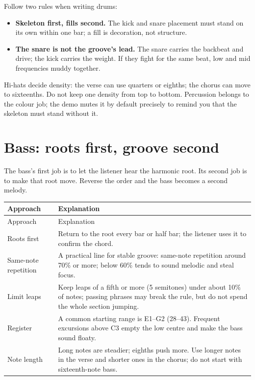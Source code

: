 Follow two rules when writing drums:

\begin{itemize}
\item \textbf{Skeleton first, fills second.} The kick and snare placement must stand on its own within one bar; a fill is decoration, not structure.
\item \textbf{The snare is not the groove's lead.} The snare carries the backbeat and drive; the kick carries the weight. If they fight for the same beat, low and mid frequencies muddy together.
\end{itemize}

Hi-hats decide density: the verse can use quarters or eighths; the chorus can move to sixteenths. Do not keep one density from top to bottom. Percussion belongs to the colour job; the demo mutes it by default precisely to remind you that the skeleton must stand without it.

\section{Bass: roots first, groove second}
\label{sec:bass}

The bass's first job is to let the listener hear the harmonic root. Its second job is to make that root move. Reverse the order and the bass becomes a second melody.

\begin{longtable}{p{}p{}}
\toprule
Approach & Explanation \\
\midrule
\endfirsthead
\toprule
Approach & Explanation \\
\midrule
\endhead
Roots first & Return to the root every bar or half bar; the listener uses it to confirm the chord. \\
Same-note repetition & A practical line for stable groove: same-note repetition around 70\% or more; below 60\% tends to sound melodic and steal focus. \\
Limit leaps & Keep leaps of a fifth or more (5 semitones) under about 10\% of notes; passing phrases may break the rule, but do not spend the whole section jumping. \\
Register & A common starting range is E1--G2 (28--43). Frequent excursions above C3 empty the low centre and make the bass sound floaty. \\
Note length & Long notes are steadier; eighths push more. Use longer notes in the verse and shorter ones in the chorus; do not start with sixteenth-note bass. \\
\bottomrule
\end{longtable}

